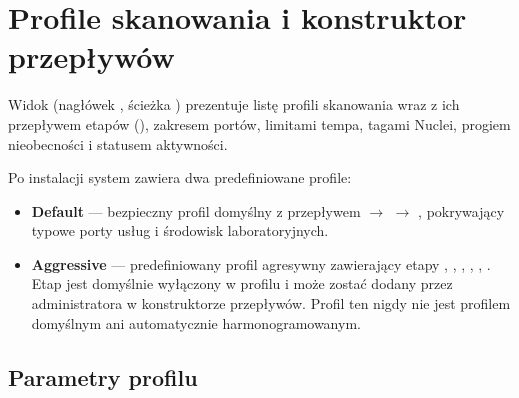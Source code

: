 \documentclass[10pt,a4paper]{article}
\begin{document}

\section{Profile skanowania i konstruktor przepływów}

Widok  (nagłówek , ścieżka ) prezentuje listę profili skanowania wraz z ich przepływem etapów (), zakresem portów, limitami tempa, tagami Nuclei, progiem nieobecności i statusem aktywności.

Po instalacji system zawiera dwa predefiniowane profile:
\begin{itemize}
  \item \textbf{Default} --- bezpieczny profil domyślny z przepływem  $\rightarrow$  $\rightarrow$ , pokrywający typowe porty usług i środowisk laboratoryjnych.
  \item \textbf{Aggressive} --- predefiniowany profil agresywny zawierający etapy , , , , , . Etap  jest domyślnie wyłączony w profilu i może zostać dodany przez administratora w konstruktorze przepływów. Profil ten nigdy nie jest profilem domyślnym ani automatycznie harmonogramowanym.
\end{itemize}

\subsection{Parametry profilu}
\end{document}
